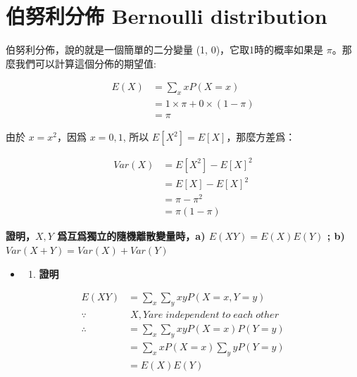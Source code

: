 \documentclass[]{ctexbook}
\providecommand{\tightlist}{%
  \setlength{\itemsep}{0pt}\setlength{\parskip}{0pt}}
\begin{document}
\chapter{伯努利分佈 Bernoulli
distribution}\label{-bernoulli-distribution}

伯努利分佈，說的就是一個簡單的二分變量 (1, 0)，它取1時的概率如果是
\(\pi\)。那麼我們可以計算這個分佈的期望值:

\begin{align}
E(X) &=\sum_x xP(X=x) \\
     &=1\times\pi + 0\times(1-\pi)\\
     &=\pi
\end{align}

由於 \(x=x^2\)，因爲 \(x=0,1\), 所以 \(E[X^2]=E[X]\)，那麼方差爲：

\begin{align}
Var(X) &=E[X^2]-E[X]^2 \\
       &=E[X]-E[X]^2 \\
       &=\pi - \pi^2 \\
       &=\pi(1-\pi)
\end{align}

\textbf{證明，\(X,Y\) 爲互爲獨立的隨機離散變量時，a) \(E(XY)=E(X)E(Y)\)
; b) \(Var(X+Y)=Var(X)+Var(Y)\)}

\begin{itemize}
\item
  \begin{enumerate}
  \def\labelenumi{\alph{enumi})}
  \tightlist
  \item
    \textbf{證明}
  \end{enumerate}
\end{itemize}

\begin{align}
E(XY) &= \sum_x\sum_y xyP(X=x, Y=y) \\
\because &\; X,Y are\;independent\;to\;each\;other \\
\therefore &= \sum_x\sum_y xyP(X=x)P(Y=y)\\
      &=\sum_x xP(X=x)\sum_y yP(Y=y)\\
      &=E(X)E(Y)
\end{align}
\end{document}
